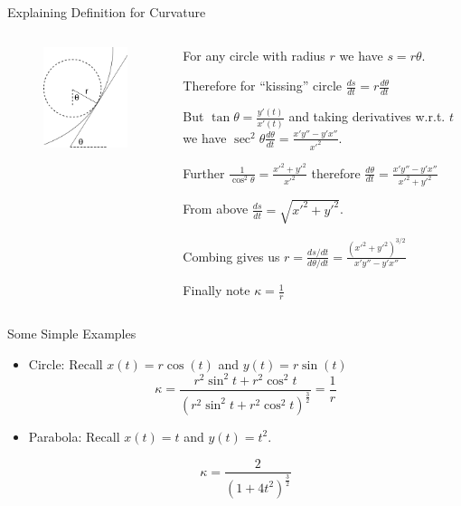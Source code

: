 \documentclass{beamer}
\begin{document}
\begin{frame}{Explaining Definition for Curvature}
	\begin{columns}
		\begin{column}{0.4\textwidth}
			\begin{figure}
				\centering
				\includegraphics[width=50mm, scale=0.5]{illustration.png}
			\end{figure}
		\end{column}
		\begin{column}{0.6\textwidth}
			For any circle with radius $r$ we have $s=r \theta$.
			
			Therefore for ``kissing'' circle 
			$\frac{ds}{dt} = r \frac{d\theta}{dt}$
			
			But $\tan \theta = \frac{y'(t)}{x'(t)}$ and taking derivatives w.r.t. $t$ we have $\sec ^2 \theta \frac{d\theta}{dt} = \frac{x' y'' - y' x''}{x'^2}$.
			
			Further $\frac{1}{\cos^2 \theta} = \frac{x'^2+y'^2}{x'^2}$ therefore
			$\frac{d\theta}{dt}=\frac{x' y'' - y' x''}{x'^2+y'^2}$
			
			From above $\frac{ds}{dt} = \sqrt{x'^2+y'^2}$.
			
			Combing gives us
			$r= \frac{ds/dt}{d\theta/dt} =\frac{(x'^2+y'^2)^{3/2}}{x' y'' - y' x''}$
			
			Finally note $\kappa = \frac{1}{r}$
			
			
			
		\end{column}
	\end{columns}

	
\end{frame}

\begin{frame}{Some Simple Examples}
	\begin{itemize}	
		\item Circle: Recall $x(t)=r \cos(t)$ and $y(t)= r \sin(t)$ 
		\[
		\kappa = \frac{r^2 \sin^2 t + r^2 \cos^2 t}{\left(r^2 \sin^2 t + r^2 \cos^2 t \right) ^ \frac{3}{2}} = \frac{1}{r}
		\]
		
		\item Parabola: Recall $x(t)=t$ and $y(t)=t^2$. 
		
		\[
		\kappa = \frac{2}{\left(1 + 4t^2 \right) ^ \frac{3}{2}}
		\]
	\end{itemize}
\end{frame}
\end{document}
